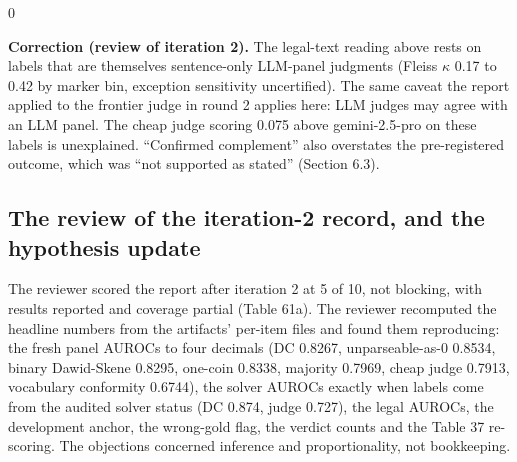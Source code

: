 \documentclass[11pt,letterpaper]{article}
\newenvironment{correction}{\par\medskip\noindent\begin{minipage}{\linewidth}\setlength{\fboxsep}{6pt}\begin{lrbox}{0}\begin{minipage}{0.96\linewidth}\small}{\end{minipage}\end{lrbox}\colorbox{black!6}{\usebox{0}}\end{minipage}\par\medskip}
\begin{document}
\begin{correction}\textbf{Correction (review of iteration 2).} The legal-text reading above rests on labels that are themselves sentence-only LLM-panel judgments (Fleiss $\kappa$ 0.17 to 0.42 by marker bin, exception sensitivity uncertified). The same caveat the report applied to the frontier judge in round 2 applies here: LLM judges may agree with an LLM panel. The cheap judge scoring 0.075 above gemini-2.5-pro on these labels is unexplained. ``Confirmed complement'' also overstates the pre-registered outcome, which was ``not supported as stated'' (Section 6.3).\end{correction}

\subsection{The review of the iteration-2 record, and the hypothesis update}

The reviewer scored the report after iteration 2 at 5 of 10, not blocking, with results reported and coverage partial (Table 61a). The reviewer recomputed the headline numbers from the artifacts' per-item files and found them reproducing: the fresh panel AUROCs to four decimals (DC 0.8267, unparseable-as-0 0.8534, binary Dawid-Skene 0.8295, one-coin 0.8338, majority 0.7969, cheap judge 0.7913, vocabulary conformity 0.6744), the solver AUROCs exactly when labels come from the audited solver status (DC 0.874, judge 0.727), the legal AUROCs, the development anchor, the wrong-gold flag, the verdict counts and the Table 37 re-scoring. The objections concerned inference and proportionality, not bookkeeping.
\end{document}

